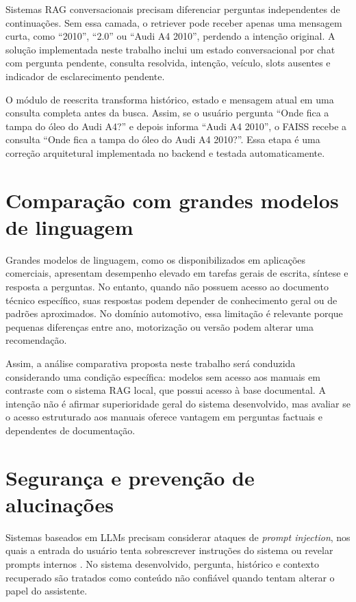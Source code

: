 Sistemas RAG conversacionais precisam diferenciar perguntas independentes de continuações. Sem essa camada, o retriever pode receber apenas uma mensagem curta, como ``2010'', ``2.0'' ou ``Audi A4 2010'', perdendo a intenção original. A solução implementada neste trabalho inclui um estado conversacional por chat com pergunta pendente, consulta resolvida, intenção, veículo, slots ausentes e indicador de esclarecimento pendente.

O módulo de reescrita transforma histórico, estado e mensagem atual em uma consulta completa antes da busca. Assim, se o usuário pergunta ``Onde fica a tampa do óleo do Audi A4?'' e depois informa ``Audi A4 2010'', o FAISS recebe a consulta ``Onde fica a tampa do óleo do Audi A4 2010?''. Essa etapa é uma correção arquitetural implementada no backend e testada automaticamente.

\section{Comparação com grandes modelos de linguagem}

Grandes modelos de linguagem, como os disponibilizados em aplicações comerciais, apresentam desempenho elevado em tarefas gerais de escrita, síntese e resposta a perguntas. No entanto, quando não possuem acesso ao documento técnico específico, suas respostas podem depender de conhecimento geral ou de padrões aproximados. No domínio automotivo, essa limitação é relevante porque pequenas diferenças entre ano, motorização ou versão podem alterar uma recomendação.

Assim, a análise comparativa proposta neste trabalho será conduzida considerando uma condição específica: modelos sem acesso aos manuais em contraste com o sistema RAG local, que possui acesso à base documental. A intenção não é afirmar superioridade geral do sistema desenvolvido, mas avaliar se o acesso estruturado aos manuais oferece vantagem em perguntas factuais e dependentes de documentação.

\section{Segurança e prevenção de alucinações}

Sistemas baseados em LLMs precisam considerar ataques de \textit{prompt injection}, nos quais a entrada do usuário tenta sobrescrever instruções do sistema ou revelar prompts internos \cite{kumar2024prompt}. No sistema desenvolvido, pergunta, histórico e contexto recuperado são tratados como conteúdo não confiável quando tentam alterar o papel do assistente.

